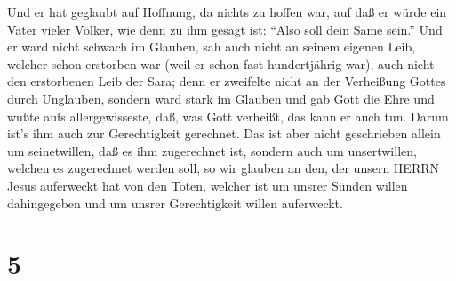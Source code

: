  Und er hat geglaubt auf Hoffnung, da nichts zu hoffen war,
auf daß er würde ein Vater vieler Völker, wie denn zu ihm gesagt ist:
``Also soll dein Same sein.''  Und er ward nicht schwach im
Glauben, sah auch nicht an seinem eigenen Leib, welcher schon erstorben
war (weil er schon fast hundertjährig war), auch nicht den erstorbenen
Leib der Sara;  denn er zweifelte nicht an der Verheißung
Gottes durch Unglauben, sondern ward stark im Glauben und gab Gott die
Ehre  und wußte aufs allergewisseste, daß, was Gott
verheißt, das kann er auch tun.  Darum ist's ihm auch zur
Gerechtigkeit gerechnet.  Das ist aber nicht geschrieben
allein um seinetwillen, daß es ihm zugerechnet ist, 
sondern auch um unsertwillen, welchen es zugerechnet werden soll, so wir
glauben an den, der unsern HERRN Jesus auferweckt hat von den Toten,
 welcher ist um unsrer Sünden willen dahingegeben und um
unsrer Gerechtigkeit willen auferweckt.

\hypertarget{section-4}{%
\section{5}\label{section-4}}

